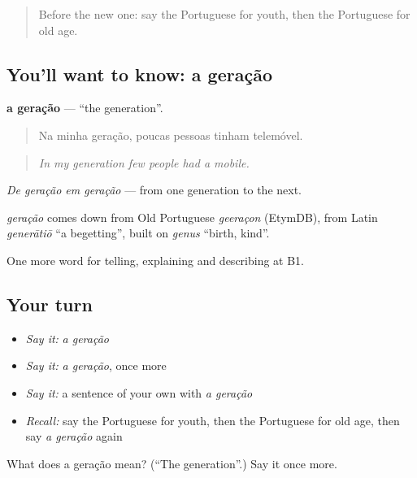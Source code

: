 \label{lesson:PT-C311-geracao}



\begin{quote}
Before the new one: say the Portuguese for youth, then the Portuguese for old age.
\end{quote}

\subsection*{You'll want to know: a geração}
\textbf{a geração} — \textquotedblleft{}the generation\textquotedblright{}.

\begin{quote}
Na minha geração, poucas pessoas tinham telemóvel.
\end{quote}

\begin{quote}
\emph{In my generation few people had a mobile.}
\end{quote}

\emph{De geração em geração} — from one generation to the next.

\begin{cousinweb}
\emph{geração} comes down from Old Portuguese \emph{geeraçon} (EtymDB), from Latin \emph{generātiō} \textquotedblleft{}a begetting\textquotedblright{}, built on \emph{genus} \textquotedblleft{}birth, kind\textquotedblright{}.
\end{cousinweb}

\begin{grammarlens}[title={What you've built}]
One more word for telling, explaining and describing at B1.
\end{grammarlens}

\subsection*{Your turn}
\begin{itemize}
\raggedright
  \item \emph{Say it:} \emph{a geração}
  \item \emph{Say it:} \emph{a geração}, once more
  \item \emph{Say it:} a sentence of your own with \emph{a geração}
  \item \emph{Recall:} say the Portuguese for youth, then the Portuguese for old age, then say \emph{a geração} again
\end{itemize}

\begin{tcolorbox}[breakable,colback=teal!4,colframe=teal!35!black,title={Before you move on}]
What does a geração mean? (\textquotedblleft{}The generation\textquotedblright{}.) Say it once more.
\end{tcolorbox}
